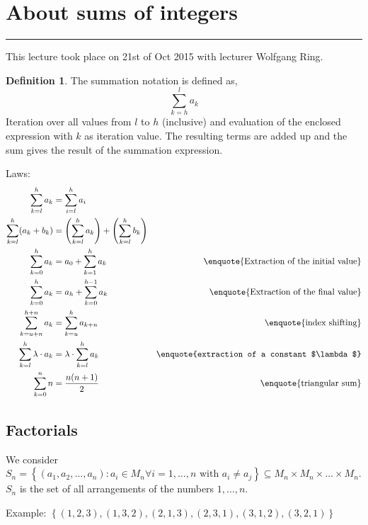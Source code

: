 \documentclass[a4paper,landscape,twocolumn]{article}
\theoremstyle{definition}
\newtheorem{defi}{Definition}
\newcommand\set[1]{\left\{#1\right\}}
\newcommand\meta[3]{\hrule{} This #1 took place on #2 with lecturer #3.\par}
\begin{document}
\section{About sums of integers}
\meta{lecture}{21st of Oct 2015}{Wolfgang Ring}

\begin{defi}
  The summation notation is defined as,
  \[ \sum_{k=h}^{l} a_k \]
  Iteration over all values from $l$ to $h$ (inclusive) and evaluation of
  the enclosed expression with $k$ as iteration value. The resulting terms
  are added up and the sum gives the result of the summation expression.
\end{defi}

Laws:
\begin{align}
    \sum_{k=l}^{h} a_k &= \sum_{i=l}^h a_i \\
    \sum_{k=l}^{h} (a_k + b_k)
        &= \left(\sum_{k=l}^h a_k\right) + \left(\sum_{k=l}^h b_k\right) \\
    \sum_{k=0}^{h} a_k
        &= a_0 + \sum_{k=1}^{h} a_k
        & \text{\enquote{Extraction of the initial value}} \\
    \sum_{k=0}^{h} a_k
        &= a_{h} + \sum_{k=0}^{h-1} a_k
        & \text{\enquote{Extraction of the final value}} \\
    \sum_{k=u+n}^{h+n} a_k
        &= \sum_{k=u}^{h} a_{k+n}
        & \text{\enquote{index shifting}} \\
    \sum_{k=l}^h \lambda \cdot a_k
        &= \lambda \cdot \sum_{k=l}^h a_k
        & \text{\enquote{extraction of a constant $\lambda$}} \\
    \sum_{k=0}^n n
        &= \frac{n (n+1)}{2}
        & \text{\enquote{triangular sum}}
\end{align}

\subsection{Factorials}
%
We consider $S_n = \set{(a_1, a_2, \ldots, a_n): a_i \in M_n \forall i = 1, \ldots, n
\text{ with } a_i \neq a_j} \subseteq M_n \times M_n \times \dots \times M_n$.
$S_n$ is the set of all arrangements of the numbers $1, \ldots, n$.

Example: $\set{(1,2,3), (1, 3, 2), (2, 1, 3), (2, 3, 1), (3, 1, 2), (3, 2, 1)}$
\end{document}
